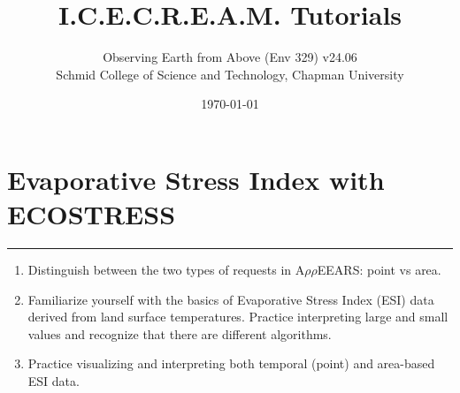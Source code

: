 \documentclass[oneside,a4paper,11pt,explicit]{book}
\title{I.C.E.C.R.E.A.M. Tutorials}
\subtitle{\small Observing Earth from Above (Env 329) v24.06 \\
	\small Schmid College of Science and Technology, Chapman University}
\date{\today}
\begin{document}
\setcounter{tocdepth}{3}
\setcounter{minitocdepth}{3}
\dominitoc

\faketableofcontents

\setcounter{chapter}{9} %

\chapter{Evaporative Stress Index with ECOSTRESS} %

\vspace{-2em}

\minitoc

\hrule

\vspace{1em}

\begin{tcolorbox}[enhanced,frame style image=blueshade.png,
	opacityback=0.75,opacitybacktitle=0.25,
	colback=blue!5!white,colframe=blue!75!black,title={\Large \textbf{Objectives:}}]
	\large
	\begin{enumerate}
		\item Distinguish between the two types of requests in A$\rho\rho$EEARS: point vs area.
		\item Familiarize yourself with the basics of Evaporative Stress Index (ESI) data derived from land surface temperatures. Practice interpreting large and small values and recognize that there are different algorithms. 
		\item Practice visualizing and interpreting both temporal (point) and area-based ESI data.  
	\end{enumerate}
\end{tcolorbox}

\clearpage
\end{document}
